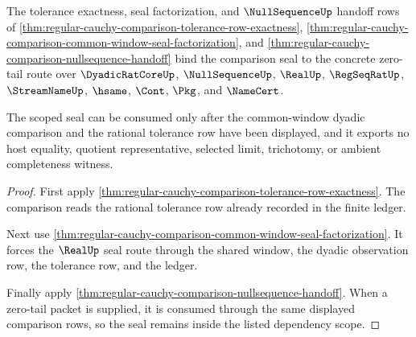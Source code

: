 \begin{theorem}
\label{thm:regular-cauchy-comparison-nullsequence-seal-scope}
The tolerance exactness, seal factorization, and $\NullSequenceUp$ handoff rows of \autoref{thm:regular-cauchy-comparison-tolerance-row-exactness}, \autoref{thm:regular-cauchy-comparison-common-window-seal-factorization}, and \autoref{thm:regular-cauchy-comparison-nullsequence-handoff} bind the comparison seal to the concrete zero-tail route over $\DyadicRatCoreUp$, $\NullSequenceUp$, $\RealUp$, $\RegSeqRatUp$, $\StreamNameUp$, $\hsame$, $\Cont$, $\Pkg$, and $\NameCert$.

The scoped seal can be consumed only after the common-window dyadic comparison and the rational tolerance row have been displayed, and it exports no host equality, quotient representative, selected limit, trichotomy, or ambient completeness witness.
\end{theorem}
\begin{proof}
First apply \autoref{thm:regular-cauchy-comparison-tolerance-row-exactness}. The comparison reads the rational tolerance row already recorded in the finite ledger.

Next use \autoref{thm:regular-cauchy-comparison-common-window-seal-factorization}. It forces the $\RealUp$ seal route through the shared window, the dyadic observation row, the tolerance row, and the ledger.

Finally apply \autoref{thm:regular-cauchy-comparison-nullsequence-handoff}. When a zero-tail packet is supplied, it is consumed through the same displayed comparison rows, so the seal remains inside the listed dependency scope.
\end{proof}

